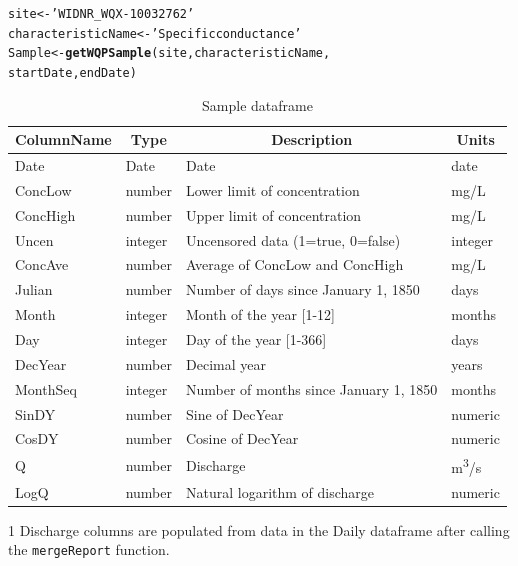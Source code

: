 \documentclass[a4paper,11pt]{article}\usepackage[]{graphicx}\usepackage[]{color}
\makeatletter
\newcommand{\hlstr}[1]{\textcolor[rgb]{0.192,0.494,0.8}{#1}}%
\newcommand{\hlstd}[1]{\textcolor[rgb]{0.345,0.345,0.345}{#1}}%
\newcommand{\hlkwb}[1]{\textcolor[rgb]{0.69,0.353,0.396}{#1}}%
\newcommand{\hlkwd}[1]{\textcolor[rgb]{0.737,0.353,0.396}{\textbf{#1}}}%
\newenvironment{kframe}{%
 \def\at@end@of@kframe{}%
 \ifinner\ifhmode%
  \def\at@end@of@kframe{\end{minipage}}%
  \begin{minipage}{\columnwidth}%
 \fi\fi%
 \def\FrameCommand##1{\hskip\@totalleftmargin \hskip-\fboxsep
 \colorbox{shadecolor}{##1}\hskip-\fboxsep
     \hskip-\linewidth \hskip-\@totalleftmargin \hskip\columnwidth}%
 \MakeFramed {\advance\hsize-\width
   \@totalleftmargin\z@ \linewidth\hsize
   \@setminipage}}%
 {\par\unskip\endMakeFramed%
 \at@end@of@kframe}
\newenvironment{knitrout}{}{} %
\makeatother
\begin{document}
\begin{knitrout}
\color{fgcolor}\begin{kframe}
\begin{alltt}
\hlstd{site} \hlkwb{<-} \hlstr{'WIDNR_WQX-10032762'}
\hlstd{characteristicName} \hlkwb{<-} \hlstr{'Specific conductance'}
\hlstd{Sample} \hlkwb{<-}\hlkwd{getWQPSample}\hlstd{(site,characteristicName,}
      \hlstd{startDate, endDate)}
\end{alltt}
\end{kframe}
\end{knitrout}


\pagebreak


\begin{table}
{\footnotesize
  \begin{threeparttable}[b]
  \caption{Sample dataframe}
  \label{tab:SampleDataframe}
  \begin{tabular}{llll}
  \hline
\multicolumn{1}{c}{\textbf{\textsf{ColumnName}}} & 
\multicolumn{1}{c}{\textbf{\textsf{Type}}} & 
\multicolumn{1}{c}{\textbf{\textsf{Description}}} & 
\multicolumn{1}{c}{\textbf{\textsf{Units}}} \\ 
  \hline
  Date & Date & Date & date \\ 
  [5pt]ConcLow & number & Lower limit of concentration & mg/L \\ 
  [5pt]ConcHigh & number & Upper limit of concentration & mg/L \\ 
  [5pt]Uncen & integer & Uncensored data (1=true, 0=false) & integer \\ 
  [5pt]ConcAve & number & Average of ConcLow and ConcHigh & mg/L \\ 
  [5pt]Julian & number & Number of days since January 1, 1850 & days \\ 
  [5pt]Month & integer & Month of the year [1-12] & months \\ 
  [5pt]Day & integer & Day of the year [1-366] & days \\ 
  [5pt]DecYear & number & Decimal year & years \\ 
  [5pt]MonthSeq & integer & Number of months since January 1, 1850 & months \\ 
  [5pt]SinDY & number & Sine of DecYear & numeric \\ 
  [5pt]CosDY & number & Cosine of DecYear & numeric \\ 
  [5pt]Q \tnote{1} & number & Discharge & m\textsuperscript{3}/s \\ 
  [5pt]LogQ \tnote{1} & number & Natural logarithm of discharge & numeric \\ 
   \hline
\end{tabular}

  \begin{tablenotes}
    \item[1] Discharge columns are populated from data in the Daily dataframe after calling the \texttt{mergeReport} function.
  \end{tablenotes}
 \end{threeparttable}
}
\end{table}
\end{document}
